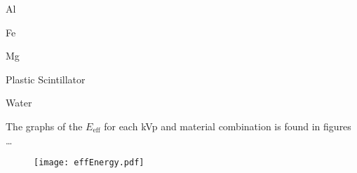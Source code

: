 \begin{table}[H]
    \centering
    \caption{Al}
    \resizebox{\textwidth}{!}{
    
    }
\end{table}

\begin{table}[H]
    \centering
    \caption{Fe}
    \resizebox{\textwidth}{!}{
    
    }
\end{table}

\begin{table}[H]
    \centering
    \caption{Mg}
    \resizebox{\textwidth}{!}{
    
    }
\end{table}




\begin{table}[H]
    \centering
    \caption{Plastic Scintillator}
    \resizebox{\textwidth}{!}{
    
    }
\end{table}

\begin{table}[H]
    \centering
    \caption{Water}
    \resizebox{\textwidth}{!}{
    
    }
\end{table}

The graphs of the $E_{\text{eff}}$ for each kVp and material combination is found in figures \dots


\begin{figure}[htbp]
    \centering
    \texttt{[image: effEnergy.pdf]}
    \caption{}
\end{figure}












